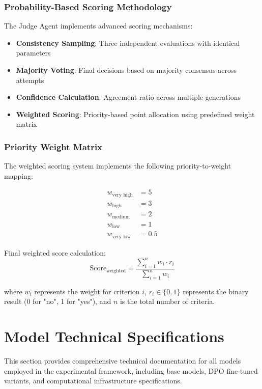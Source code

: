 \subsubsection{Probability-Based Scoring Methodology}

The Judge Agent implements advanced scoring mechanisms:

\begin{itemize}
    \item \textbf{Consistency Sampling}: Three independent evaluations with identical parameters
    \item \textbf{Majority Voting}: Final decisions based on majority consensus across attempts
    \item \textbf{Confidence Calculation}: Agreement ratio across multiple generations
    \item \textbf{Weighted Scoring}: Priority-based point allocation using predefined weight matrix
\end{itemize}

\subsubsection{Priority Weight Matrix}

The weighted scoring system implements the following priority-to-weight mapping:

\begin{align}
w_{\text{very high}} &= 5 \\
w_{\text{high}} &= 3 \\
w_{\text{medium}} &= 2 \\
w_{\text{low}} &= 1 \\
w_{\text{very low}} &= 0.5
\end{align}

Final weighted score calculation:
$$\text{Score}_{\text{weighted}} = \frac{\sum_{i=1}^{n} w_i \cdot r_i}{\sum_{i=1}^{n} w_i}$$

where $w_i$ represents the weight for criterion $i$, $r_i \in \{0,1\}$ represents the binary result (0 for "no", 1 for "yes"), and $n$ is the total number of criteria.

\section{Model Technical Specifications}
\label{sec:model-technical-specs}

This section provides comprehensive technical documentation for all models employed in the experimental framework, including base models, DPO fine-tuned variants, and computational infrastructure specifications.


